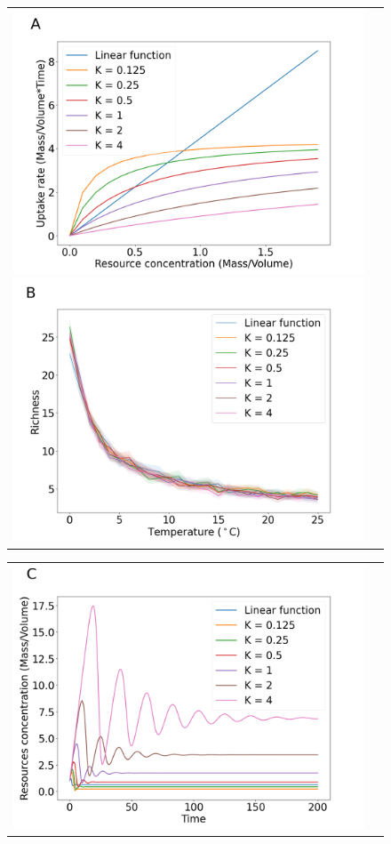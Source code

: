 \begin{figure}[H]
    \centering
    \begin{tabular}{c@{}c@{}}
    \includegraphics[scale=0.27]{./Figures/K.png}
    \includegraphics[scale=0.27]{./Figures/K_rich.png}
    \end{tabular}
    \hfill
    \begin{tabular}{c@{}c@{}}
    \includegraphics[scale=0.27]{./Figures/K_res.png}

\end{tabular}
\end{figure}
